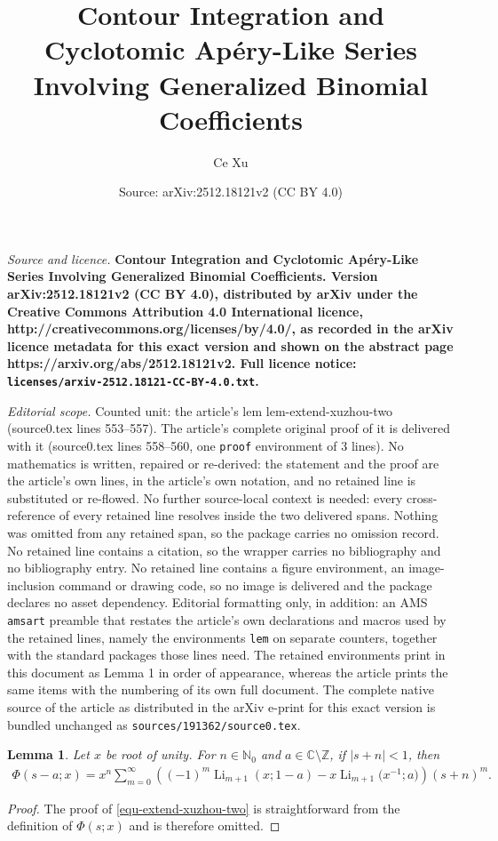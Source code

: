 \documentclass[10pt,a4paper]{amsart}
\title{\bf Contour Integration and Cyclotomic Ap\'ery-Like Series Involving Generalized Binomial Coefficients}
\author{Ce Xu}
\date{Source: arXiv:2512.18121v2 (CC BY 4.0)}
\newtheorem{lem}{Lemma}
\DeclareMathOperator{\Li}{Li}
\def\N{\mathbb{N}}
\def\Z{\mathbb{Z}}
\begin{document}
\maketitle

\noindent\emph{Source and licence.} \bf Contour Integration and Cyclotomic Ap\'ery-Like Series Involving Generalized Binomial Coefficients. Version arXiv:2512.18121v2 (CC BY 4.0), distributed by arXiv under the Creative Commons Attribution 4.0 International licence, http://creativecommons.org/licenses/by/4.0/, as recorded in the arXiv licence metadata for this exact version and shown on the abstract page https://arxiv.org/abs/2512.18121v2. Full licence notice: \texttt{licenses/arxiv-2512.18121-CC-BY-4.0.txt}.\par\smallskip

\noindent\textit{Editorial scope.} Counted unit: the article's lem lem-extend-xuzhou-two (source0.tex lines 553--557). The article's complete original proof of it is delivered with it (source0.tex lines 558--560, one \texttt{proof} environment of 3 lines). No mathematics is written, repaired or re-derived: the statement and the proof are the article's own lines, in the article's own notation, and no retained line is substituted or re-flowed.  No further source-local context is needed: every cross-reference of every retained line resolves inside the two delivered spans.  Nothing was omitted from any retained span, so the package carries no omission record.  No retained line contains a citation, so the wrapper carries no bibliography and no bibliography entry.  No retained line contains a figure environment, an image-inclusion command or drawing code, so no image is delivered and the package declares no asset dependency.  Editorial formatting only, in addition: an AMS \texttt{amsart} preamble that restates the article's own declarations and macros used by the retained lines, namely the environments \texttt{lem} on separate counters, together with the standard packages those lines need.  The retained environments print in this document as Lemma 1 in order of appearance, whereas the article prints the same items with the numbering of its own full document.  The complete native source of the article as distributed in the arXiv e-print for this exact version is bundled unchanged as \texttt{sources/191362/source0.tex}.
\begin{lem}\label{lem-extend-xuzhou-two} Let $x$ be root of unity. For $n\in\N_0$ and $a\in \mathbb{C}\setminus \Z$, if $|s+n|<1$, then
\begin{align}\label{equ-extend-xuzhou-two}
\Phi(s-a;x)=x^n\sum_{m=0}^\infty \left((-1)^m \Li_{m+1}(x;1-a)-x \Li_{m+1}\Big(x^{-1};a\Big) \right)(s+n)^m.
\end{align}
\end{lem}

\begin{proof}
The proof of \eqref{equ-extend-xuzhou-two} is straightforward from the definition of $\Phi(s;x)$ and is therefore omitted.
\end{proof}
\end{document}
